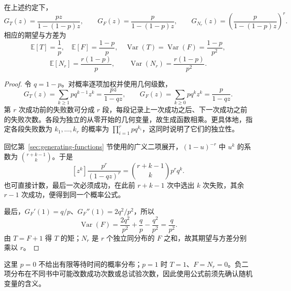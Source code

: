 \documentclass[lang=cn,a4paper,fontset=none,zihao=false,10pt,openany,twoside]{beautybook}
\numberwithin{algorithm}{chapter}
\begin{document}
\begin{proposition}[等待时间的生成函数]\label{prop:waiting-pgf}
在上述约定下，
\[
 G_T(z)=\frac{pz}{1-(1-p)z},\qquad
 G_F(z)=\frac p{1-(1-p)z},\qquad
 G_{N_r}(z)=\left(\frac p{1-(1-p)z}\right)^r.
\]
相应的期望与方差为
\[
 \mathbb E[T]=\frac1p,\quad\mathbb E[F]=\frac{1-p}{p},\quad
 \operatorname{Var}(T)=\operatorname{Var}(F)=\frac{1-p}{p^2},
\]
\[
 \mathbb E[N_r]=\frac{r(1-p)}p,\qquad
 \operatorname{Var}(N_r)=\frac{r(1-p)}{p^2}.
\]
\end{proposition}
\begin{proof}
令 $q=1-p$。对概率逐项加权并使用几何级数，
\[
 G_T(z)=\sum_{k\ge1}pq^{k-1}z^k=\frac{pz}{1-qz},\qquad
 G_F(z)=\sum_{k\ge0}pq^kz^k=\frac p{1-qz}.
\]
第 $r$ 次成功前的失败数可分成 $r$ 段，每段记录上一次成功之后、下一次成功之前的失败次数。各段为独立的从零开始的几何变量，故生成函数相乘。更具体地，指定各段失败数为 $k_1,\ldots,k_r$ 的概率为 $\prod_{i=1}^r pq^{k_i}$，这同时说明了它们的独立性。

回忆第~\ref{sec:generating-functions} 节使用的广义二项展开，$(1-u)^{-r}$ 中 $u^k$ 的系数为 $\binom{r+k-1}{k}$。于是
\[
 [z^k]\frac{p^r}{(1-qz)^r}=\binom{r+k-1}{k}p^rq^k.
\]
也可直接计数，最后一次必须成功，在此前 $r+k-1$ 次中选出 $k$ 次失败，其余 $r-1$ 次成功，便得到同一个概率公式。

最后，$G_F'(1)=q/p$、$G_F''(1)=2q^2/p^2$，所以
\[
 \operatorname{Var}(F)=\frac{2q^2}{p^2}+\frac qp-\frac{q^2}{p^2}=\frac q{p^2}.
\]
由 $T=F+1$ 得 $T$ 的矩；$N_r$ 是 $r$ 个独立同分布的 $F$ 之和，故其期望与方差分别乘以 $r$。
\end{proof}
这里 $p=0$ 不给出有限等待时间的概率分布；$p=1$ 时 $T=1$、$F=N_r=0$。负二项分布在不同书中可能改数成功次数或总试验次数，因此使用公式前须先确认随机变量的含义。
\end{document}
